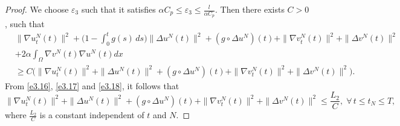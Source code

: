 \begin{proof}
We choose $\varepsilon_{3}$ such that it satisfies
$\alpha C_p \leq \varepsilon_{3}\leq \frac{l}{\alpha C_p}$.
Then there exists $C>0$, such that
\begin{equation}
\begin{aligned}
&\| \nabla u^N_{t}(t) \|^2+\Big( 1 - \int_0^t g(s)\,ds \Big) \| \Delta u^N(t) \|^2
+ (g \circ \Delta u^N)(t) + \| \nabla v^N_{t}(t) \|^2+ \| \Delta v^N(t) \|^2\\
&+2 \alpha \int_{\Omega} \nabla v^N (t)\nabla u^N (t) dx \\
&\geq C \Big( \| \nabla u^N_{t}(t) \|^2+ \| \Delta u^N (t)\|^2
+ (g \circ \Delta u^N)(t) + \| \nabla v^N_{t}(t) \|^2
+ \| \Delta v^N (t)\|^2 \Big).
\end{aligned} \label{e3.18}
\end{equation}
From \eqref{e3.16}, \eqref{e3.17} and \eqref{e3.18}, it follows that
\begin{equation}
\| \nabla u^N_{t}(t) \|^2+ \| \Delta u^N(t) \|^2 + (g \circ \Delta u^N)(t)
+ \| \nabla v^N_{t}(t) \|^2+ \| \Delta v^N(t) \|^2
\leq \frac{L_2}{C}, \; \forall\, t\leq t_{N} \leq T,\label{e3.19}
 \end{equation}
where $\frac{L_2}{C}$ is a constant independent of $t$ and $N$.
\smallskip


\end{proof}
